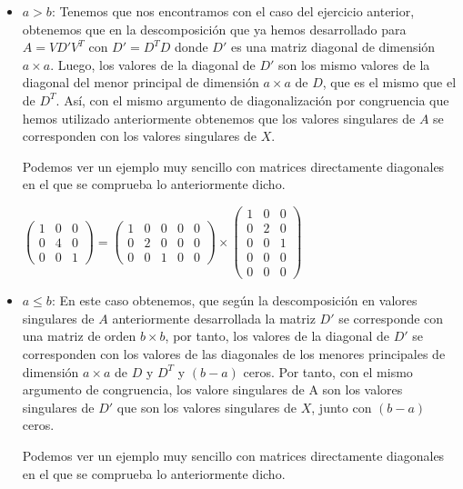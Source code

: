 \documentclass{article}
\begin{document}
	\begin{itemize}
		\item $a > b$: Tenemos que nos encontramos con el caso del ejercicio anterior, obtenemos que en la descomposición que ya hemos desarrollado para $A = V D' V^T$ con $D' = D^T D$ donde $D'$ es una matriz diagonal de dimensión $a \times a$. Luego, los valores de la diagonal de $D'$ son los mismo valores de la diagonal del menor principal de dimensión $a \times a$ de $D$, que es el mismo que el de $D^T$. Así, con el mismo argumento de diagonalización por congruencia que hemos utilizado anteriormente obtenemos que los valores singulares de $A$ se corresponden con los valores singulares de $X$.
		
		Podemos ver un ejemplo muy sencillo con matrices directamente diagonales en el que se comprueba lo anteriormente dicho.
 		
			\begin{center}
			$
			\left(\begin{matrix}
			1 & 0 & 0\\
			0 & 4 & 0\\
			0 & 0 & 1
			\end{matrix}\right)
			=
			\left(\begin{matrix}
			1 & 0 & 0 & 0 & 0\\
			0 & 2 & 0 & 0 & 0\\
			0 & 0 & 1 & 0 & 0
			\end{matrix}\right)
			\times
			\left(\begin{matrix}
			1 & 0 & 0\\
			0 & 2 & 0\\
			0 & 0 & 1\\
			0 & 0 & 0\\
			0 & 0 & 0
			\end{matrix}\right)
			$
		\end{center}
		\item $a \leq b$: En este caso obtenemos, que según la descomposición en valores singulares de $A$ anteriormente desarrollada la matriz $D'$ se corresponde con una matriz de orden $b \times b$, por tanto, los valores de la diagonal de $D'$ se corresponden con los valores de las diagonales de los menores principales de dimensión $a \times a$ de $D$  y $D^T$ y $(b-a)$ ceros. Por tanto, con el mismo argumento de congruencia, los valore singulares de A son los valores singulares de $D'$ que son los valores singulares de $X$, junto con $(b-a)$ ceros.
		
		Podemos ver un ejemplo muy sencillo con matrices directamente diagonales en el que se comprueba lo anteriormente dicho.
		 

\end{itemize}
\end{document}
